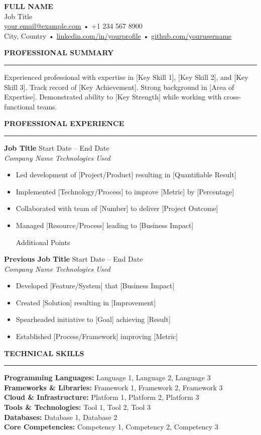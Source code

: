\documentclass[11pt,a4paper]{article}
\newcommand{\resumeSection}[1]{
  \vspace{2mm}
  {\large\textbf{#1}}
  \vspace{1mm}
  \hrule
  \vspace{1mm}
}
\newcommand{\roleHeader}[4]{
  \textbf{#1} \hfill #2 \\
  \textit{#3} \hfill \textit{#4}
}
\begin{document}
\begin{center}
{\Large\textbf{FULL NAME}}\\
\vspace{1mm}
Job Title\\
\vspace{1mm}
\href{mailto:your.email@example.com}{your.email@example.com} • +1 234 567 8900\\
City, Country • \href{https://linkedin.com/in/yourprofile}{linkedin.com/in/yourprofile} • \href{https://github.com/yourusername}{github.com/yourusername}
\end{center}

\resumeSection{PROFESSIONAL SUMMARY}
Experienced professional with expertise in [Key Skill 1], [Key Skill 2], and [Key Skill 3]. Track record of [Key Achievement]. Strong background in [Area of Expertise]. Demonstrated ability to [Key Strength] while working with cross-functional teams.

\resumeSection{PROFESSIONAL EXPERIENCE}
\roleHeader{Job Title}{Start Date -- End Date}{Company Name}{Technologies Used}
\begin{itemize}[nosep,leftmargin=*]
  \item Led development of [Project/Product] resulting in [Quantifiable Result]
  \item Implemented [Technology/Process] to improve [Metric] by [Percentage]
  \item Collaborated with team of [Number] to deliver [Project Outcome]
  \item Managed [Resource/Process] leading to [Business Impact]
  \item [Additional Points]
\end{itemize}

\roleHeader{Previous Job Title}{Start Date -- End Date}{Company Name}{Technologies Used}
\begin{itemize}[nosep,leftmargin=*]
  \item Developed [Feature/System] that [Business Impact]
  \item Created [Solution] resulting in [Improvement]
  \item Spearheaded initiative to [Goal] achieving [Result]
  \item Established [Process/Framework] improving [Metric]
\end{itemize}

\resumeSection{TECHNICAL SKILLS}
\textbf{Programming Languages:} Language 1, Language 2, Language 3\\
\textbf{Frameworks \& Libraries:} Framework 1, Framework 2, Framework 3\\
\textbf{Cloud \& Infrastructure:} Platform 1, Platform 2, Platform 3\\
\textbf{Tools \& Technologies:} Tool 1, Tool 2, Tool 3\\
\textbf{Databases:} Database 1, Database 2\\
\textbf{Core Competencies:} Competency 1, Competency 2, Competency 3
\end{document}
